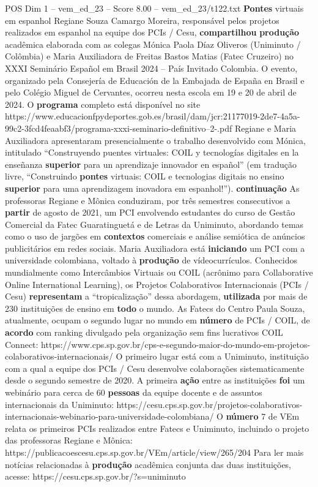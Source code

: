 \begin{textsample}{POS Dim 1 – vem\_ed\_23 – Score 8.00 – vem\_ed\_23/t122.txt}  \label{ex:f1_pos_140}
\textbf{Pontes} virtuais em espanhol Regiane Souza Camargo Moreira, responsável pelos projetos realizados em espanhol na equipe dos PCIs / Cesu, \textbf{compartilhou} \textbf{produção} acadêmica elaborada com as colegas Mónica Paola Díaz Oliveros (Uniminuto / Colômbia) e Maria Auxiliadora de Freitas Bastos Matias (Fatec Cruzeiro) no XXXI Seminário Español em Brasil 2024 – País Invitado Colombia.
O evento, organizado pela Consejería de Educación de la Embajada de España en Brasil e pelo Colégio Miguel de Cervantes, ocorreu nesta escola em 19 e 20 de abril de 2024.
O \textbf{programa} completo está disponível no site https://www.educacionfpydeportes.gob.es/brasil/dam/jcr:21177019-2de7-4a5a-99c2-3fcd4feaabf3/programa-xxxi-seminario-definitivo--2-.pdf Regiane e Maria Auxiliadora apresentaram presencialmente o trabalho desenvolvido com Mónica, intitulado “Construyendo puentes virtuales: COIL y tecnologías digitales en la enseñanza \textbf{superior} para un aprendizaje innovador en español” (em tradução livre, “Construindo \textbf{pontes} virtuais: COIL e tecnologias digitais no ensino \textbf{superior} para uma aprendizagem inovadora em espanhol!”). \textbf{continuação} As professoras Regiane e Mônica conduziram, por três semestres consecutivos a \textbf{partir} de agosto de 2021, um PCI envolvendo estudantes do curso de Gestão Comercial da Fatec Guaratinguetá e de Letras da Uniminuto, abordando temas como o uso de jargões em \textbf{contextos} comerciais e análise semiótica de anúncios publicitários em redes sociais.
Maria Auxiliadora está \textbf{iniciando} um PCI com a universidade colombiana, voltado à \textbf{produção} de vídeocurrículos.
Conhecidos mundialmente como Intercâmbios Virtuais ou COIL (acrônimo para Collaborative Online International Learning), os Projetos Colaborativos Internacionais (PCIs / Cesu) \textbf{representam} a “tropicalização” dessa abordagem, \textbf{utilizada} por mais de 230 instituições de ensino em \textbf{todo} o mundo.
As Fatecs do Centro Paula Souza, atualmente, ocupam o segundo lugar no mundo em \textbf{número} de PCIs / COIL, de \textbf{acordo} com ranking divulgado pela organização sem fins lucrativos COIL Connect: https://www.cps.sp.gov.br/cps-e-segundo-maior-do-mundo-em-projetos-colaborativos-internacionais/ O primeiro lugar está com a Uniminuto, instituição com a qual a equipe dos PCIs / Cesu desenvolve colaborações sistematicamente desde o segundo semestre de 2020.
A primeira \textbf{ação} entre as instituições \textbf{foi} um webinário para cerca de 60 \textbf{pessoas} da equipe docente e de assuntos internacionais da Uniminuto: https://cesu.cps.sp.gov.br/projetos-colaborativos-internacionais-webinario-para-universidade-colombiana/ O \textbf{número} 7 de VEm relata os primeiros PCIs realizados entre Fatecs e Uniminuto, incluindo o projeto das professoras Regiane e Mônica: https://publicacoescesu.cps.sp.gov.br/VEm/article/view/265/204 Para ler mais notícias relacionadas à \textbf{produção} acadêmica conjunta das duas instituições, acesse: https://cesu.cps.sp.gov.br/?s=uniminuto

\end{textsample}
